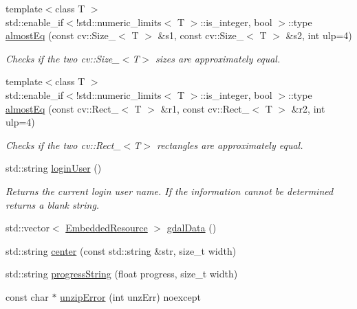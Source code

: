 \begin{DoxyCompactItemize}
{\footnotesize template$<$class T $>$ }\\std\+::enable\+\_\+if$<$!std\+::numeric\+\_\+limits$<$ T $>$\+::is\+\_\+integer, bool $>$\+::type \hyperlink{group___utility_module_ga71b9189756badfb3f5466bf9f0549203}{almost\+Eq} (const cv\+::\+Size\+\_\+$<$ T $>$ \&s1, const cv\+::\+Size\+\_\+$<$ T $>$ \&s2, int ulp=4)
\begin{DoxyCompactList}\small\item\em Checks if the two cv\+::\+Size\+\_\+$<$\+T$>$ sizes are approximately equal. \end{DoxyCompactList}\item 
{\footnotesize template$<$class T $>$ }\\std\+::enable\+\_\+if$<$!std\+::numeric\+\_\+limits$<$ T $>$\+::is\+\_\+integer, bool $>$\+::type \hyperlink{group___utility_module_ga115e2428efbb3b6d3105d8f2fab75e51}{almost\+Eq} (const cv\+::\+Rect\+\_\+$<$ T $>$ \&r1, const cv\+::\+Rect\+\_\+$<$ T $>$ \&r2, int ulp=4)
\begin{DoxyCompactList}\small\item\em Checks if the two cv\+::\+Rect\+\_\+$<$\+T$>$ rectangles are approximately equal. \end{DoxyCompactList}\item 
std\+::string \hyperlink{group___utility_module_ga7eb961cce72452d6bc60ca27f699bad6}{login\+User} ()
\begin{DoxyCompactList}\small\item\em Returns the current login user name. If the information cannot be determined returns a blank string. \end{DoxyCompactList}\item 
std\+::vector$<$ \hyperlink{structdg_1_1deepcore_1_1_embedded_resource}{Embedded\+Resource} $>$ \hyperlink{namespacedg_1_1deepcore_a03f6e7d5cdfe836e05971aebdfe39af2}{gdal\+Data} ()
\item 
std\+::string \hyperlink{namespacedg_1_1deepcore_a60a6e789dc5541737ef1429bc39d6635}{center} (const std\+::string \&str, size\+\_\+t width)
\item 
std\+::string \hyperlink{namespacedg_1_1deepcore_ad0ae2792453751f4ed8444126c673dc0}{progress\+String} (float progress, size\+\_\+t width)
\item 
const char $\ast$ \hyperlink{namespacedg_1_1deepcore_a0c24e3f3ec1175311028a99cc155f324}{unzip\+Error} (int unz\+Err) noexcept
\end{DoxyCompactItemize}
